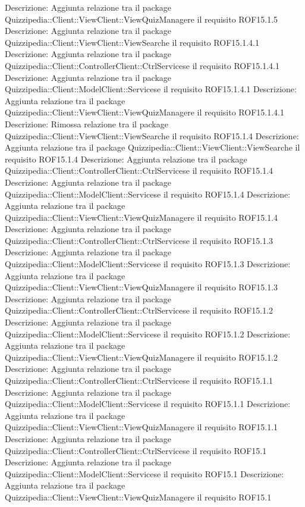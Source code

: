 Descrizione: Aggiunta relazione tra il package Quizzipedia::Client::ViewClient::ViewQuizManagere il requisito ROF15.1.5 
Descrizione: Aggiunta relazione tra il package Quizzipedia::Client::ViewClient::ViewSearche il requisito ROF15.1.4.1 
Descrizione: Aggiunta relazione tra il package Quizzipedia::Client::ControllerClient::CtrlServicese il requisito ROF15.1.4.1 
Descrizione: Aggiunta relazione tra il package Quizzipedia::Client::ModelClient::Servicese il requisito ROF15.1.4.1 
Descrizione: Aggiunta relazione tra il package Quizzipedia::Client::ViewClient::ViewQuizManagere il requisito ROF15.1.4.1 
Descrizione: Rimossa relazione tra il package Quizzipedia::Client::ViewClient::ViewSearche il requisito ROF15.1.4 
Descrizione: Aggiunta relazione tra il package Quizzipedia::Client::ViewClient::ViewSearche il requisito ROF15.1.4 
Descrizione: Aggiunta relazione tra il package Quizzipedia::Client::ControllerClient::CtrlServicese il requisito ROF15.1.4 
Descrizione: Aggiunta relazione tra il package Quizzipedia::Client::ModelClient::Servicese il requisito ROF15.1.4 
Descrizione: Aggiunta relazione tra il package Quizzipedia::Client::ViewClient::ViewQuizManagere il requisito ROF15.1.4 
Descrizione: Aggiunta relazione tra il package Quizzipedia::Client::ControllerClient::CtrlServicese il requisito ROF15.1.3 
Descrizione: Aggiunta relazione tra il package Quizzipedia::Client::ModelClient::Servicese il requisito ROF15.1.3 
Descrizione: Aggiunta relazione tra il package Quizzipedia::Client::ViewClient::ViewQuizManagere il requisito ROF15.1.3 
Descrizione: Aggiunta relazione tra il package Quizzipedia::Client::ControllerClient::CtrlServicese il requisito ROF15.1.2 
Descrizione: Aggiunta relazione tra il package Quizzipedia::Client::ModelClient::Servicese il requisito ROF15.1.2 
Descrizione: Aggiunta relazione tra il package Quizzipedia::Client::ViewClient::ViewQuizManagere il requisito ROF15.1.2 
Descrizione: Aggiunta relazione tra il package Quizzipedia::Client::ControllerClient::CtrlServicese il requisito ROF15.1.1 
Descrizione: Aggiunta relazione tra il package Quizzipedia::Client::ModelClient::Servicese il requisito ROF15.1.1 
Descrizione: Aggiunta relazione tra il package Quizzipedia::Client::ViewClient::ViewQuizManagere il requisito ROF15.1.1 
Descrizione: Aggiunta relazione tra il package Quizzipedia::Client::ControllerClient::CtrlServicese il requisito ROF15.1 
Descrizione: Aggiunta relazione tra il package Quizzipedia::Client::ModelClient::Servicese il requisito ROF15.1 
Descrizione: Aggiunta relazione tra il package Quizzipedia::Client::ViewClient::ViewQuizManagere il requisito ROF15.1 

